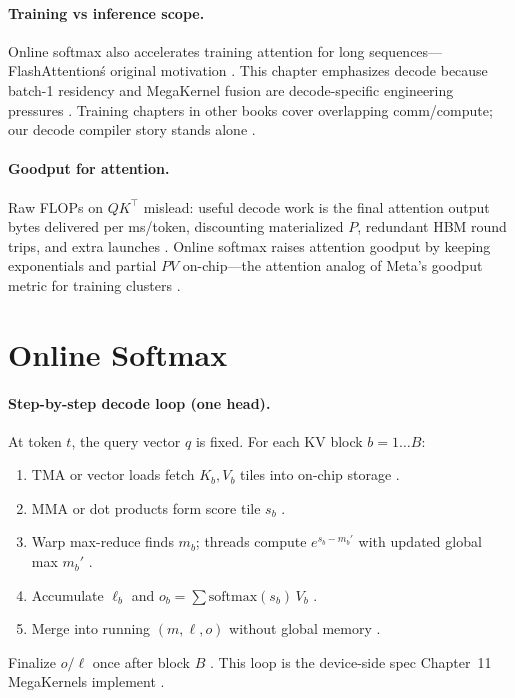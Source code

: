 \paragraph{Training vs inference scope.} Online softmax also accelerates training attention for long sequences---FlashAttention\'s original motivation \citep{dao2022flashattention}. This chapter emphasizes decode because batch-1 residency and MegaKernel fusion are decode-specific engineering pressures \citep{taxbreak2026,dao2023flashdecoding,patel2025llminference}. Training chapters in other books cover overlapping comm/compute; our decode compiler story stands alone \citep{dlbook,chen2020compilerbasedhardw,yirage2026}.
\paragraph{Goodput for attention.} Raw FLOPs on $QK^\top$ mislead: useful decode work is the final attention output bytes delivered per ms/token, discounting materialized $P$, redundant HBM round trips, and extra launches \citep{patel2025llminference,memoryfloor2026}. Online softmax raises attention goodput by keeping exponentials and partial $PV$ on-chip---the attention analog of Meta's goodput metric for training clusters \citep{dlbook,taxbreak2026}.


\section{Online Softmax}
\label{sec:ch10_online_softmax}
\paragraph{Step-by-step decode loop (one head).} At token $t$, the query vector $q$ is fixed. For each KV block $b=1\ldots B$:
\begin{enumerate}
\item TMA or vector loads fetch $K_b,V_b$ tiles into on-chip storage \citep{semianalysis2024tma,kwon2023vllm}.
\item MMA or dot products form score tile $s_b$ \citep{nvidia2022hopper,dao2022flashattention}.
\item Warp max-reduce finds $m_b$; threads compute $e^{s_b-m_b'}$ with updated global max $m_b'$ \citep{dao2022flashattention}.
\item Accumulate $\ell_b$ and $o_b=\sum \mathrm{softmax}(s_b)\,V_b$ \citep{dao2022flashattention,dao2023flashdecoding}.
\item Merge into running $(m,\ell,o)$ without global memory \citep{yirage2026,memoryfloor2026}.
\end{enumerate}
Finalize $o/\ell$ once after block $B$ \citep{dlbook}. This loop is the device-side spec Chapter~11 MegaKernels implement \citep{taxbreak2026,chen2020compilerbasedhardw}.

